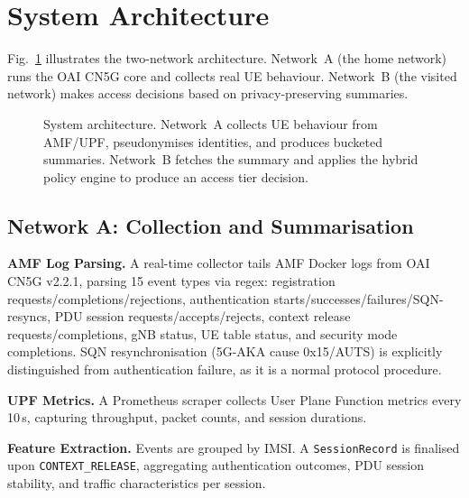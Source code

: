 \documentclass[conference]{IEEEtran}
\begin{document}
\section{System Architecture}
\label{sec:architecture}

Fig.~\ref{fig:architecture} illustrates the two-network architecture. Network~A (the home network) runs the OAI CN5G core and collects real UE behaviour. Network~B (the visited network) makes access decisions based on privacy-preserving summaries.

\begin{figure}[t]
    \centering
    \caption{System architecture. Network~A collects UE behaviour from AMF/UPF, pseudonymises identities, and produces bucketed summaries. Network~B fetches the summary and applies the hybrid policy engine to produce an access tier decision.}
    \label{fig:architecture}
\end{figure}

\subsection{Network A: Collection and Summarisation}

\textbf{AMF Log Parsing.} A real-time collector tails AMF Docker logs from OAI CN5G v2.2.1, parsing 15 event types via regex: registration requests/completions/rejections, authentication starts/successes/failures/SQN-resyncs, PDU session requests/accepts/rejects, context release requests/completions, gNB status, UE table status, and security mode completions. SQN resynchronisation (5G-AKA cause 0x15/AUTS) is explicitly distinguished from authentication failure, as it is a normal protocol procedure.

\textbf{UPF Metrics.} A Prometheus scraper collects User Plane Function metrics every 10\,s, capturing throughput, packet counts, and session durations.

\textbf{Feature Extraction.} Events are grouped by IMSI. A \texttt{SessionRecord} is finalised upon \texttt{CONTEXT\_RELEASE}, aggregating authentication outcomes, PDU session stability, and traffic characteristics per session.
\end{document}
